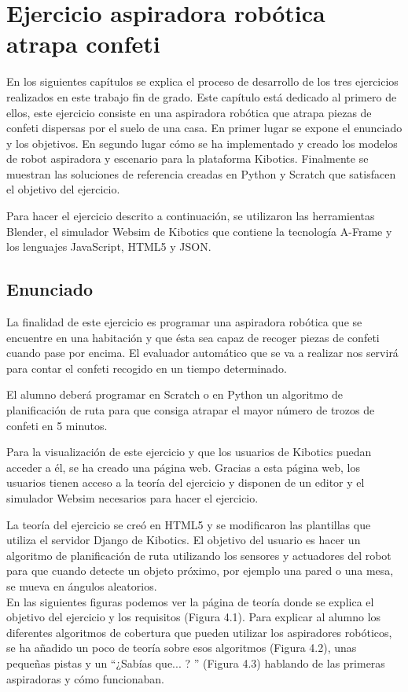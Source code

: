 \chapter{Ejercicio aspiradora robótica atrapa confeti}\label{chap:aspiradora}
En los siguientes capítulos se explica el proceso de desarrollo de los tres ejercicios realizados en este trabajo fin de grado. Este capítulo está dedicado al primero de ellos, este ejercicio consiste en una aspiradora robótica que atrapa piezas de confeti dispersas por el suelo de una casa. En primer lugar se expone el enunciado y los objetivos. En segundo lugar cómo se ha implementado y creado los modelos de robot aspiradora y escenario para la plataforma Kibotics. Finalmente se muestran las soluciones de referencia creadas en Python y Scratch que satisfacen el objetivo del ejercicio.

Para hacer el ejercicio descrito a continuación, se utilizaron las herramientas Blender, el simulador Websim de Kibotics que contiene la tecnología A-Frame y los lenguajes JavaScript, HTML5 y JSON.

\section{Enunciado}
La finalidad de este ejercicio es programar una aspiradora robótica que se encuentre en una habitación y que ésta sea capaz de recoger piezas de confeti cuando pase por encima. El evaluador automático que se va a realizar nos servirá para contar el confeti recogido en un tiempo determinado.

El alumno deberá programar en Scratch o en Python un algoritmo de planificación de ruta para que consiga atrapar el mayor número de trozos de confeti en 5 minutos.

Para la visualización de este ejercicio y que los usuarios de Kibotics puedan acceder a él, se ha creado una página web. Gracias a esta página web, los usuarios tienen acceso a la teoría del ejercicio y  disponen de un editor y el simulador Websim necesarios para hacer el ejercicio. 

La teoría del ejercicio se creó en HTML5 y se modificaron las plantillas que utiliza el servidor Django de Kibotics. El objetivo del usuario  es hacer un algoritmo de planificación de ruta utilizando los sensores y actuadores del robot para que cuando detecte un objeto próximo, por ejemplo una pared o una mesa, se mueva en ángulos aleatorios. 
\\
En las siguientes figuras podemos ver la página de teoría donde se explica el objetivo del ejercicio y los requisitos (Figura 4.1). Para explicar al alumno los diferentes algoritmos de cobertura que pueden utilizar los aspiradores robóticos, se ha añadido un poco de teoría sobre esos algoritmos (Figura  4.2), unas pequeñas pistas y un ``¿Sabías que... ? '' (Figura 4.3) hablando de las primeras aspiradoras y cómo funcionaban. 
\\

